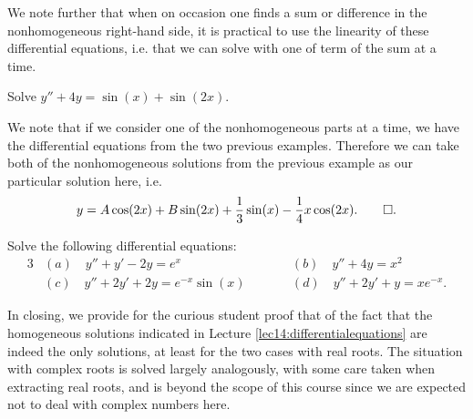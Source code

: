 \noindent
We note further that when on occasion one finds a sum or difference in the nonhomogeneous right-hand side, it is practical to use the linearity of these differential equations, i.e. that we can solve with one of term of the sum at a time.

\begin{example}
	Solve $y'' + 4 y = \sin(x) + \sin(2 x)$.

	We note that if we consider one of the nonhomogeneous parts at a time, we have the differential equations from the two previous examples.
	Therefore we can take both of the nonhomogeneous solutions from the previous example as our particular solution here, i.e.
	\[
		y = A \cos(2 x) + B \sin(2 x) + \frac{1}{3} \sin(x) - \frac{1}{4} x \cos(2 x). \qedhere.
	\]
\end{example}

\begin{exercise}
	Solve the following differential equations:
	\begin{alignat*}{3}
		&(a) \quad y'' + y' - 2 y = e^x \qquad &&(b) \quad y'' + 4 y = x^2 \\
		&(c) \quad y'' + 2 y' + 2 y = e^{-x} \sin(x) \qquad &&(d) \quad y'' + 2 y' + y = x e^{-x}.
	\end{alignat*}
\end{exercise}

\noindent
In closing, we provide for the curious student proof that of the fact that the homogeneous solutions indicated in Lecture \ref{lec14:differentialequations} are indeed the only solutions, at least for the two cases with real roots.
The situation with complex roots is solved largely analogously, with some care taken when extracting real roots, and is beyond the scope of this course since we are expected not to deal with complex numbers here.

